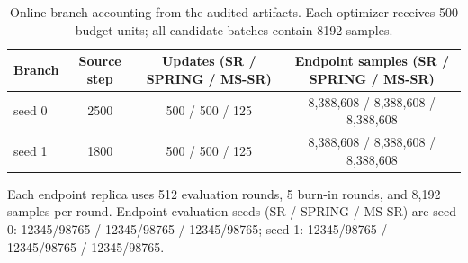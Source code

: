 \begin{table}[h]
\centering
\small
\begin{tabular}{lccc}
\toprule
Branch & Source step & Updates (SR / SPRING / MS-SR)
  & Endpoint samples (SR / SPRING / MS-SR) \\
\midrule
seed 0 & 2500 & 500 / 500 / 125 & 8,388,608 / 8,388,608 / 8,388,608 \\
seed 1 & 1800 & 500 / 500 / 125 & 8,388,608 / 8,388,608 / 8,388,608 \\
\bottomrule
\end{tabular}
\caption{Online-branch accounting from the audited artifacts. Each optimizer
receives 500 budget units; all candidate batches contain 8192 samples.}
\label{tab:online_protocol}
\end{table}

Each endpoint replica uses 512 evaluation rounds, 5 burn-in rounds, and 8,192 samples per round. Endpoint evaluation seeds (SR / SPRING / MS-SR) are seed 0: 12345/98765 / 12345/98765 / 12345/98765; seed 1: 12345/98765 / 12345/98765 / 12345/98765.
